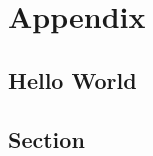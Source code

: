 \documentclass{note}
\begin{document}
\chapter*{Appendix}

\lipsum[5-10]

\section*{Hello World}

\lipsum[10-20]

\section{Section}

\lipsum[5-10]


\end{document}
